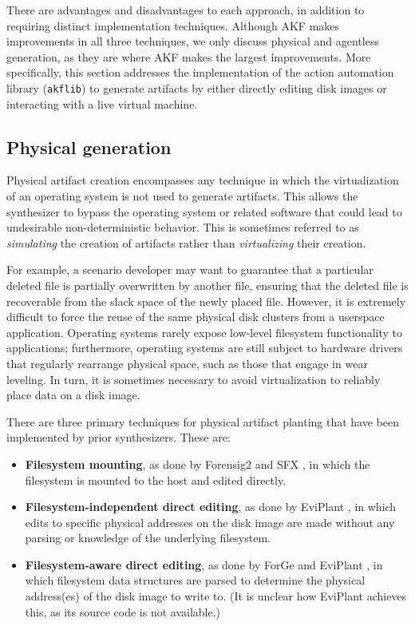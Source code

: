 \documentclass[final,5p,times,twocolumn]{elsarticle}
\newcommand{\passthrough}[1]{#1}
\begin{document}
There are advantages and disadvantages to each approach, in addition to
requiring distinct implementation techniques. Although AKF makes
improvements in all three techniques, we only discuss physical and
agentless generation, as they are where AKF makes the largest
improvements. More specifically, this section addresses the
implementation of the action automation library
(\passthrough{\lstinline!akflib!}) to generate artifacts by either
directly editing disk images or interacting with a live virtual machine.

\subsection{Physical generation}\label{physical-generation}

Physical artifact creation encompasses any technique in which the
virtualization of an operating system is not used to generate artifacts.
This allows the synthesizer to bypass the operating system or related
software that could lead to undesirable non-deterministic behavior. This
is sometimes referred to as \emph{simulating} the creation of artifacts
rather than \emph{virtualizing} their creation.

For example, a scenario developer may want to guarantee that a
particular deleted file is partially overwritten by another file,
ensuring that the deleted file is recoverable from the slack space of
the newly placed file. However, it is extremely difficult to force the
reuse of the same physical disk clusters from a userspace application.
Operating systems rarely expose low-level filesystem functionality to
applications; furthermore, operating systems are still subject to
hardware drivers that regularly rearrange physical space, such as those
that engage in wear leveling. In turn, it is sometimes necessary to
avoid virtualization to reliably place data on a disk image.

There are three primary techniques for physical artifact planting that
have been implemented by prior synthesizers. These are:

\begin{itemize}
\item
  \textbf{Filesystem mounting}, as done by Forensig2
  \cite{mochForensicImageGenerator2009} and SFX
  \cite{russellForensicImageDescription2012}, in which the
  filesystem is mounted to the host and edited directly.
\item
  \textbf{Filesystem-independent direct editing}, as done by EviPlant
  \cite{scanlonEviPlantEfficientDigital2017}, in which edits to
  specific physical addresses on the disk image are made without any
  parsing or knowledge of the underlying filesystem.
\item
  \textbf{Filesystem-aware direct editing}, as done by ForGe
  \cite{vistiAutomaticCreationComputer2015} and EviPlant
  \cite{scanlonEviPlantEfficientDigital2017}, in which filesystem
  data structures are parsed to determine the physical address(es) of
  the disk image to write to. (It is unclear how EviPlant achieves this,
  as its source code is not available.)
\end{itemize}
\end{document}
